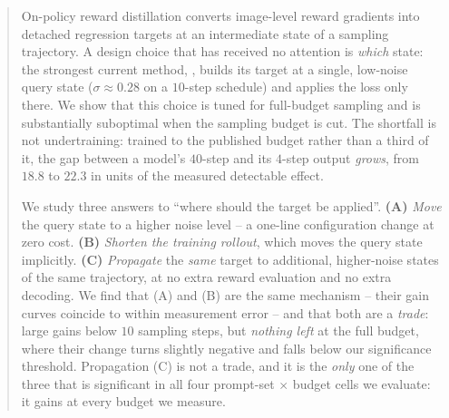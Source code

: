 \begin{abstract}
On-policy reward distillation converts image-level reward gradients into detached
regression targets at an intermediate state of a sampling trajectory. A design choice
that has received no attention is \emph{which} state: the strongest current method,
\opsd, builds its target at a single, low-noise query state ($\sigma\!\approx\!0.28$ on a
$10$-step schedule) and applies the loss only there. We show that this choice is tuned
for full-budget sampling and is substantially suboptimal when the sampling budget is cut.
The shortfall is not undertraining: trained to the published budget rather than a third of
it, the gap between a model's $40$-step and its $4$-step output \emph{grows}, from $18.8$
to $22.3$ in units of the measured detectable effect.

We study three answers to ``where should the target be applied''. \textbf{(A)} \emph{Move}
the query state to a higher noise level -- a one-line configuration change at zero cost.
\textbf{(B)} \emph{Shorten the training rollout}, which moves the query state implicitly.
\textbf{(C)} \emph{Propagate} the \emph{same} target to additional, higher-noise states of
the same trajectory, at no extra reward evaluation and no extra decoding.
We find that (A) and (B) are the same mechanism -- their gain curves coincide to within
measurement error -- and that both are a \emph{trade}: large gains below $10$ sampling
steps, but \emph{nothing left} at the full budget, where their change turns slightly
negative and falls below our significance threshold. Propagation (C) is not
a trade, and it is the \emph{only} one of the three that is significant in all four
prompt-set $\times$ budget cells we evaluate: it gains at every budget we measure.


\end{abstract}
